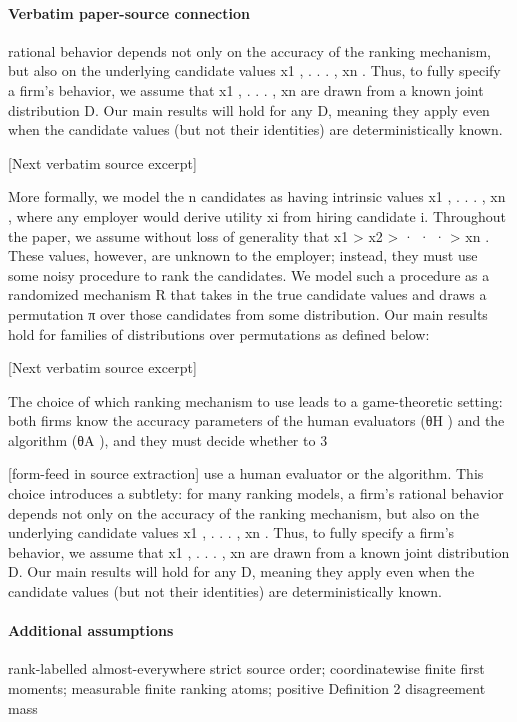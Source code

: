 \documentclass[10pt]{article}
\begin{document}
\paragraph{Verbatim paper-source connection}
\begin{ReviewVerbatim}
rational behavior depends not only on the accuracy of the ranking mechanism, but also on the underlying
candidate values x1 , . . . , xn . Thus, to fully specify a firm’s behavior, we assume that x1 , . . . , xn are drawn
from a known joint distribution D. Our main results will hold for any D, meaning they apply even when the
candidate values (but not their identities) are deterministically known.

[Next verbatim source excerpt]

More formally, we model the n candidates as having intrinsic values x1 , . . . , xn , where any employer would
derive utility xi from hiring candidate i. Throughout the paper, we assume without loss of generality that
x1 > x2 > · · · > xn . These values, however, are unknown to the employer; instead, they must use some
noisy procedure to rank the candidates. We model such a procedure as a randomized mechanism R that
takes in the true candidate values and draws a permutation π over those candidates from some distribution.
Our main results hold for families of distributions over permutations as defined below:

[Next verbatim source excerpt]

The choice of which ranking mechanism to use leads to a game-theoretic setting: both firms know the
accuracy parameters of the human evaluators (θH ) and the algorithm (θA ), and they must decide whether to
3


[form-feed in source extraction]
use a human evaluator or the algorithm. This choice introduces a subtlety: for many ranking models, a firm’s
rational behavior depends not only on the accuracy of the ranking mechanism, but also on the underlying
candidate values x1 , . . . , xn . Thus, to fully specify a firm’s behavior, we assume that x1 , . . . , xn are drawn
from a known joint distribution D. Our main results will hold for any D, meaning they apply even when the
candidate values (but not their identities) are deterministically known.
\end{ReviewVerbatim}

\paragraph{Additional assumptions}
\begin{sloppypar}
rank-labelled almost-everywhere strict source order; coordinatewise finite first moments; measurable finite ranking atoms; positive Definition 2 disagreement mass
\end{sloppypar}
\end{document}
